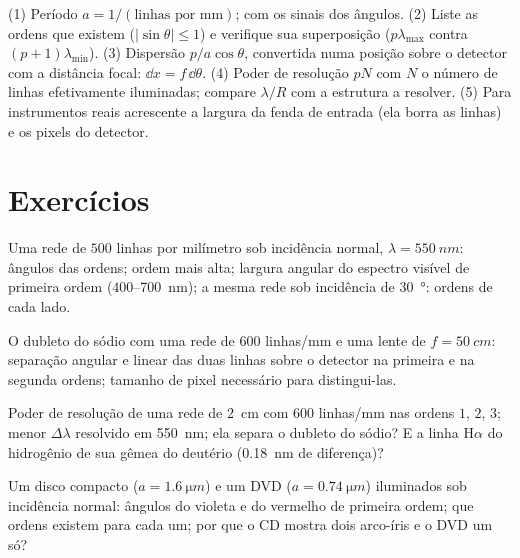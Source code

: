 \begin{method}\label{met:b2:gratings:method}
(1) Período $a = 1/(\text{linhas por mm})$;  com os
sinais dos ângulos. (2) Liste as ordens que existem ($|\sin\theta| \le 1$)
e verifique sua superposição ($p\lambda_{\max}$ contra $(p + 1)\lambda_{\min}$). (3)
Dispersão $p/a\cos\theta$, convertida numa posição sobre o detector com
a distância focal: $\dd x = f\,\dd\theta$. (4) Poder de resolução $pN$ com $N$ o
número de linhas efetivamente iluminadas; compare $\lambda/R$ com a estrutura a
resolver. (5) Para instrumentos reais acrescente a largura da fenda de entrada (ela
borra as linhas) e os pixels do detector.
\end{method}

\section{Exercícios}

\begin{exercise}[$\star$]\label{exo:b2:gratings:1}
Uma rede de $500$ linhas por milímetro sob incidência normal, $\lambda =
\qty{550}{nm}$: ângulos das ordens; ordem mais alta; largura angular do
espectro visível de primeira ordem ($400$--\qty{700}{nm}); a mesma rede sob
incidência de \qty{30}{\degree}: ordens de cada lado.
\end{exercise}

\begin{exercise}[$\star$]\label{exo:b2:gratings:2}
O dubleto do sódio com uma rede de $600$ linhas/mm e uma lente de $f =
\qty{50}{cm}$: separação angular e linear das duas linhas sobre o
detector na primeira e na segunda ordens; tamanho de pixel necessário para
distingui-las.
\end{exercise}

\begin{exercise}[$\star$]\label{exo:b2:gratings:3}
Poder de resolução de uma rede de \qty{2}{cm} com $600$ linhas/mm nas ordens $1$, $2$,
$3$; menor $\Delta\lambda$ resolvido em \qty{550}{nm}; ela separa o dubleto do
sódio? E a linha H$\alpha$ do hidrogênio de sua gêmea do deutério (\qty{0.18}{nm}
de diferença)?
\end{exercise}

\begin{exercise}[$\star$]\label{exo:b2:gratings:4}
Um disco compacto ($a = \qty{1.6}{\micro m}$) e um DVD ($a = \qty{0.74}{\micro m}$) iluminados sob
incidência normal: ângulos do violeta e do vermelho de primeira ordem; que ordens
existem para cada um; por que o CD mostra dois arco-íris e o DVD um só?
\end{exercise}

